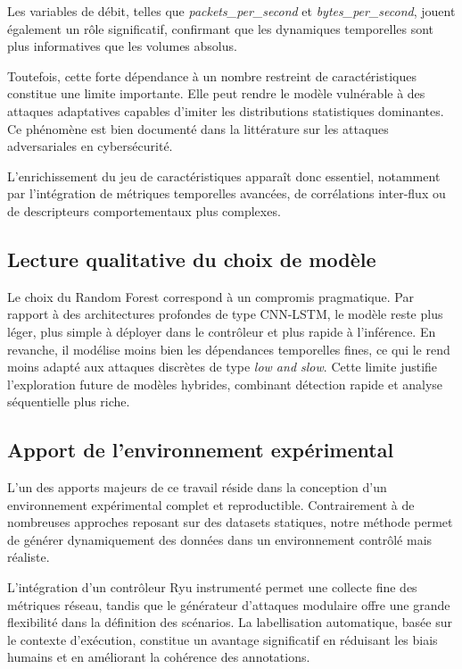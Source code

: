 \documentclass[11pt]{article}
\begin{document}
Les variables de débit, telles que \textit{packets\_per\_second} et \textit{bytes\_per\_second}, jouent également un rôle significatif, confirmant que les dynamiques temporelles sont plus informatives que les volumes absolus.

Toutefois, cette forte dépendance à un nombre restreint de caractéristiques constitue une limite importante. Elle peut rendre le modèle vulnérable à des attaques adaptatives capables d’imiter les distributions statistiques dominantes. Ce phénomène est bien documenté dans la littérature sur les attaques adversariales en cybersécurité.

L’enrichissement du jeu de caractéristiques apparaît donc essentiel, notamment par l’intégration de métriques temporelles avancées, de corrélations inter-flux ou de descripteurs comportementaux plus complexes.

\subsection{Lecture qualitative du choix de modèle}

Le choix du Random Forest correspond à un compromis pragmatique. Par rapport à des architectures profondes de type CNN-LSTM, le modèle reste plus léger, plus simple à déployer dans le contrôleur et plus rapide à l’inférence. En revanche, il modélise moins bien les dépendances temporelles fines, ce qui le rend moins adapté aux attaques discrètes de type \textit{low and slow}. Cette limite justifie l’exploration future de modèles hybrides, combinant détection rapide et analyse séquentielle plus riche.

\subsection{Apport de l’environnement expérimental}

L’un des apports majeurs de ce travail réside dans la conception d’un environnement expérimental complet et reproductible. Contrairement à de nombreuses approches reposant sur des datasets statiques, notre méthode permet de générer dynamiquement des données dans un environnement contrôlé mais réaliste.

L’intégration d’un contrôleur Ryu instrumenté permet une collecte fine des métriques réseau, tandis que le générateur d’attaques modulaire offre une grande flexibilité dans la définition des scénarios. La labellisation automatique, basée sur le contexte d’exécution, constitue un avantage significatif en réduisant les biais humains et en améliorant la cohérence des annotations.
\end{document}

